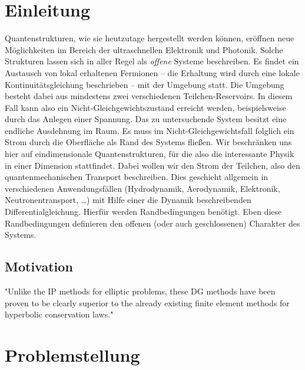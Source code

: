 \chapter{Einleitung}
Quantenstrukturen, wie sie heutzutage hergestellt werden können, eröffnen neue Möglichkeiten im Bereich der ultraschnellen Elektronik und Photonik. Solche Strukturen lassen sich in aller Regel als \emph{offene} Systeme beschreiben. Es findet ein Austausch von lokal erhaltenen Fermionen -- die Erhaltung wird durch eine lokale Kontinuitätsgleichung beschrieben -- mit der Umgebung statt. Die Umgebung besteht dabei aus mindestens zwei verschiedenen Teilchen-Reservoirs. In diesem Fall kann also ein Nicht-Gleichgewichtszustand erreicht werden, beispielsweise durch das Anlegen einer Spannung. Das zu untersuchende System besitzt eine endliche Ausdehnung im Raum. Es muss im Nicht-Gleichgewichtsfall folglich ein Strom durch die Oberfläche als Rand des Systems fließen. Wir beschränken uns hier auf eindimensionale Quantenstrukturen, für die also die interessante Physik in einer Dimension stattfindet. Dabei wollen wir den Strom der Teilchen, also den quantenmechanischen Transport beschreiben. Dies geschieht allgemein in verschiedenen Anwendungsfällen (Hydrodynamik, Aerodynamik, Elektronik, Neutronentransport, \dots) mit Hilfe einer die Dynamik beschreibenden Differentialgleichung. Hierfür werden Randbedingungen benötigt. Eben diese Randbedingungen definieren den offenen (oder auch geschlossenen) Charakter des Systems.
\section{Motivation}
"Unlike the IP methods for elliptic problems, these DG methods have been proven to be clearly superior to the already existing finite element methods for hyperbolic conservation laws." \cite{arnold2002unified}

\chapter{Problemstellung}

